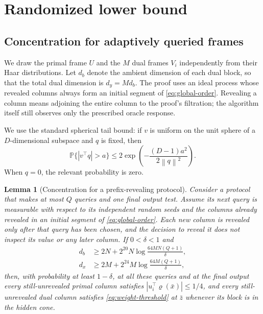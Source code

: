 \documentclass[11pt,a4paper]{article}
\newcommand{\Pp}{\mathbb P}
\newcommand{\norm}[1]{\left\lVert #1\right\rVert}
\newtheorem{lemma}[theorem]{Lemma}
\theoremstyle{definition}
\theoremstyle{remark}
\numberwithin{equation}{section}
\begin{document}
\section{Randomized lower bound}
\label{sec:haar}

\subsection{Concentration for adaptively queried frames}

We draw the primal frame $U$ and the $M$ dual frames $V_i$ independently from
their Haar distributions.  Let $d_b$ denote the ambient dimension of each
dual block, so that the total dual dimension is $d_y=Md_b$.  The proof uses
an ideal process whose revealed columns always form an initial segment of
\eqref{eq:global-order}.  Revealing a column means adjoining the entire
column to the proof's filtration; the algorithm itself still observes only
the prescribed oracle response.

We use the standard spherical tail bound: if $v$ is uniform on the unit
sphere of a $D$-dimensional subspace and $q$ is fixed, then
\begin{equation}
 \Pp\{|v^\top q|>a\}
 \le2\exp\!\left(-\frac{(D-1)a^2}{2\norm q^2}\right).
 \label{eq:spherical-tail}
\end{equation}
When $q=0$, the relevant probability is zero.

\begin{lemma}[Concentration for a prefix-revealing protocol]
\label{lem:adaptive-frame}
Consider a protocol that makes at most $Q$ queries and one final output
test.  Assume its next query is measurable with respect to its independent
random seeds and the columns already revealed in an initial segment of
\eqref{eq:global-order}.  Each new column is revealed only after that query
has been chosen, and the decision to reveal it does not inspect its value
or any later column.  If $0<\delta<1$ and
\begin{align}
 d_b&\ge2N+2^{20}N\log\frac{64MN(Q+1)}{\delta},
 \label{eq:dy-bound}\\
 d_x&\ge2M+2^{24}M\log\frac{64M(Q+1)}{\delta},
 \label{eq:dx-bound}
\end{align}
then, with probability at least $1-\delta$, at all these queries and at the
final output every still-unrevealed primal column satisfies
$|u_i^\top\varrho(\bar x)|\le1/4$, and every still-unrevealed dual column
satisfies \eqref{eq:weight-threshold} at $\bar z$ whenever its block is in
the hidden cone.
\end{lemma}
\end{document}
